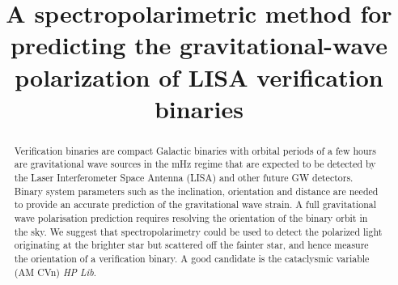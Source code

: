 \documentclass[10pt,a4paper]{article}
\title{A spectropolarimetric method for predicting the gravitational-wave polarization of LISA verification binaries}
\begin{document}
\maketitle

\begin{abstract}
  Verification binaries are compact Galactic binaries with orbital periods of a few hours are gravitational wave sources in the mHz regime that are expected to be detected by the Laser Interferometer Space Antenna (LISA) and other future GW detectors.  Binary system parameters such as the inclination, orientation and distance are needed to provide an accurate prediction of the gravitational wave strain. A full gravitational wave polarisation prediction requires resolving the orientation of the binary orbit in the sky.  We suggest that spectropolarimetry could be used to detect the polarized light originating at the brighter star but scattered off the fainter star, and hence measure the orientation of a verification binary.  A good candidate is the cataclysmic variable (AM CVn) \emph{HP Lib}.
\end{abstract}
\end{document}
